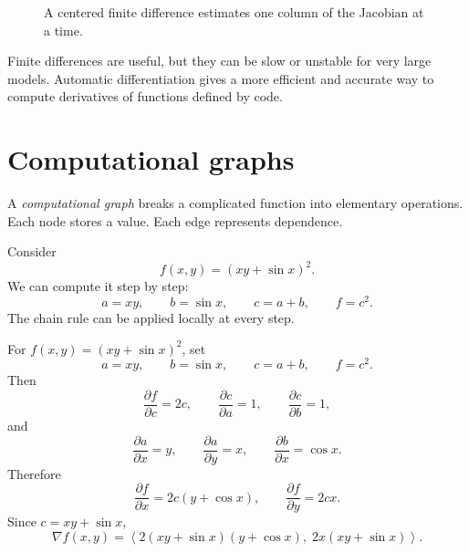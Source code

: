 \documentclass[11pt]{article}
\newcommand{\grad}{\nabla}
\begin{document}
\begin{figure}[H]
\centering
{}
\caption{A centered finite difference estimates one column of the Jacobian at a time.}
\end{figure}

Finite differences are useful, but they can be slow or unstable for very large models. Automatic differentiation gives a more efficient and accurate way to compute derivatives of functions defined by code.

\section{Computational graphs}

A \emph{computational graph} breaks a complicated function into elementary operations. Each node stores a value. Each edge represents dependence.

Consider
\[
f(x,y)=(xy+\sin x)^2.
\]
We can compute it step by step:
\[
a=xy,\qquad b=\sin x,\qquad c=a+b,\qquad f=c^2.
\]
The chain rule can be applied locally at every step.

\begin{workedexample}
For $f(x,y)=(xy+\sin x)^2$, set
\[
a=xy,\qquad b=\sin x,\qquad c=a+b,\qquad f=c^2.
\]
Then
\[
\frac{\partial f}{\partial c}=2c,
\qquad
\frac{\partial c}{\partial a}=1,
\qquad
\frac{\partial c}{\partial b}=1,
\]
and
\[
\frac{\partial a}{\partial x}=y,
\qquad
\frac{\partial a}{\partial y}=x,
\qquad
\frac{\partial b}{\partial x}=\cos x.
\]
Therefore
\[
\frac{\partial f}{\partial x}=2c(y+\cos x),
\qquad
\frac{\partial f}{\partial y}=2cx.
\]
Since $c=xy+\sin x$,
\[
\grad f(x,y)=\left\langle 2(xy+\sin x)(y+\cos x),\;2x(xy+\sin x)\right\rangle.
\]
\end{workedexample}
\end{document}
